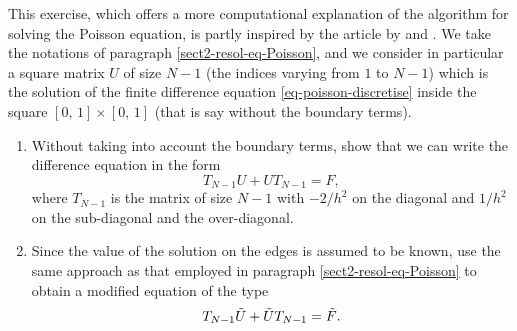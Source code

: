  
\begin{exo}
\label{exo-formulation-matrix-fish}
 
This exercise, which offers a more computational explanation of the algorithm for solving the Poisson equation, is partly inspired by the article by  and . We take the notations of paragraph \ref{sect2-resol-eq-Poisson}, and we consider in particular a square matrix $ U $ of size $ N-1 $ (the indices varying from $ 1 $ to $ N-1 $) which is the solution of the finite difference equation \eqref{eq-poisson-discretise} inside the square $ [0, \, 1] \times [0, \, 1] $ (that is say without the boundary terms). \begin{enumerate}
\item Without taking into account the boundary terms, show that we can write the difference equation in the form
\begin{equation*}
T_{N-1} U + U T_{N-1} = F,
\end{equation*}
where $ T_{N-1} $ is the matrix of size $ N-1 $ with $ -2 / h^2 $ on the diagonal and $ 1 / h^2 $ on the sub-diagonal and the over-diagonal.
\item Since the value of the solution on the edges is assumed to be known, use the same approach as that employed in paragraph \ref{sect2-resol-eq-Poisson} to obtain a modified equation of the type
\begin{equation}
\label{eqn-exo-matrix-formulation-1}
T_{N-1} \tilde{U} + \tilde{U} T_{N-1} = \tilde{F}.
\end{equation}
 

\end{enumerate}
\end{exo}
